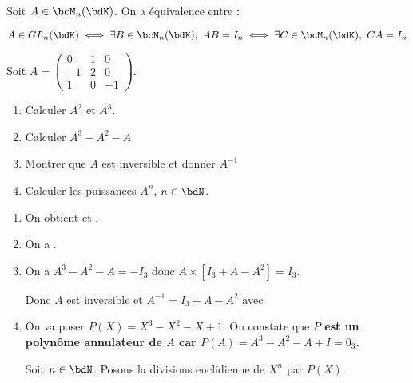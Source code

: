\documentclass[a4paper,french,bookmarks]{article}
\begin{document}
\begin{theorem}{}{}
    Soit $A \in \bcM_n(\bdK)$. On a équivalence entre :
    
    \[ A \in GL_n(\bdK) \iff \exists B \in \bcM_n(\bdK), \ AB = I_n \iff \exists C \in \bcM_n(\bdK), \ CA = I_n\]
\end{theorem}


\newpage
\begin{example}{}{}
    Soit $A = \begin{pmatrix}0 & 1 & 0\\ -1 & 2 & 0\\ 1 & 0 & -1\end{pmatrix}$.
    
    \begin{enumerate}
        \item Calculer $A^2$ et $A^3$.
        \item Calculer $A^3 - A^2 - A$
        \item Montrer que $A$ est inversible et donner $A^{-1}$
        \item Calculer les puissances $A^n$, $n \in \bdN$.
    \end{enumerate}
    \tcblower
    
    \begin{enumerate}
        \item On obtient  et .
        
        \item On a .
        
        \item On a $A^3 - A^2 - A = -I_3$ donc $A\times\left[I_3 + A - A^2\right] = I_3$.
        
        Donc $A$ est inversible et $A^{-1} = I_3 + A - A^2$ avec 
        
        \item On va poser $P(X) = X^3 - X^2 - X + 1$. On constate que \bf{$P$ est un polynôme annulateur de $A$} car $P(A) = A^3 - A^2 - A + I = 0_3$.
        
        Soit $n \in \bdN$. Posons la divisions euclidienne de $X^n$ par $P(X)$.
    \end{enumerate}
\end{example}
\end{document}
